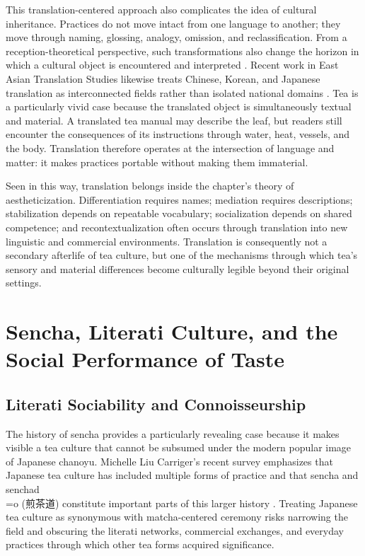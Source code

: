 \documentclass[numbers]{IntechOpen-Book}
\newcommand{\zh}[1]{{\CJKfontspec{Noto Serif CJK SC}\upshape #1}}
\begin{document}
This translation-centered approach also complicates the idea of cultural inheritance. Practices do not move intact from one language to another; they move through naming, glossing, analogy, omission, and reclassification. From a reception-theoretical perspective, such transformations also change the horizon in which a cultural object is encountered and interpreted \cite{jauss}. Recent work in East Asian Translation Studies likewise treats Chinese, Korean, and Japanese translation as interconnected fields rather than isolated national domains \cite{xu}. Tea is a particularly vivid case because the translated object is simultaneously textual and material. A translated tea manual may describe the leaf, but readers still encounter the consequences of its instructions through water, heat, vessels, and the body. Translation therefore operates at the intersection of language and matter: it makes practices portable without making them immaterial.

Seen in this way, translation belongs inside the chapter's theory of aestheticization. Differentiation requires names; mediation requires descriptions; stabilization depends on repeatable vocabulary; socialization depends on shared competence; and recontextualization often occurs through translation into new linguistic and commercial environments. Translation is consequently not a secondary afterlife of tea culture, but one of the mechanisms through which tea's sensory and material differences become culturally legible beyond their original settings.

\section{Sencha, Literati Culture, and the Social Performance of Taste}

\subsection{Literati Sociability and Connoisseurship}

The history of sencha provides a particularly revealing case because it makes visible a tea culture that cannot be subsumed under the modern popular image of Japanese chanoyu. Michelle Liu Carriger's recent survey emphasizes that Japanese tea culture has included multiple forms of practice and that sencha and senchad\\=o (\zh{煎茶道}) constitute important parts of this larger history \cite{carriger}. Treating Japanese tea culture as synonymous with matcha-centered ceremony risks narrowing the field and obscuring the literati networks, commercial exchanges, and everyday practices through which other tea forms acquired significance.
\end{document}
